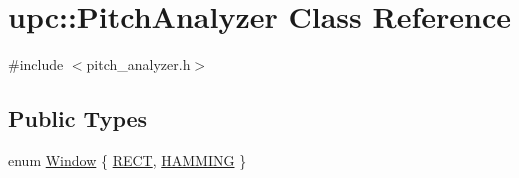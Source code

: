 \hypertarget{classupc_1_1PitchAnalyzer}{}\section{upc\+:\+:Pitch\+Analyzer Class Reference}
\label{classupc_1_1PitchAnalyzer}


{\ttfamily \#include $<$pitch\+\_\+analyzer.\+h$>$}

\subsection*{Public Types}
\begin{DoxyCompactItemize}
\item 
enum \hyperlink{classupc_1_1PitchAnalyzer_ab82b7694d6bc72839e5be6e526be81b6}{Window} \{ \hyperlink{classupc_1_1PitchAnalyzer_ab82b7694d6bc72839e5be6e526be81b6ae89513dddf240af8bbef3358597f244c}{R\+E\+CT}, 
\hyperlink{classupc_1_1PitchAnalyzer_ab82b7694d6bc72839e5be6e526be81b6a20e793e736a503aacbed0294970a9b33}{H\+A\+M\+M\+I\+NG}
 \}
\end{DoxyCompactItemize}
